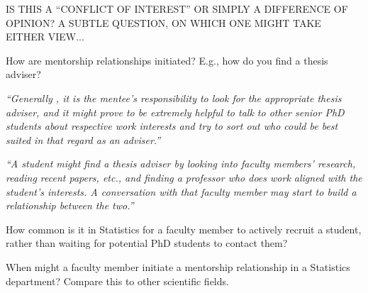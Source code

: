 \documentclass[portrait,11pt]{seminar}
\begin{document}
\medskip
IS THIS A ``CONFLICT OF INTEREST'' OR SIMPLY A DIFFERENCE OF OPINION? A SUBTLE QUESTION, ON WHICH ONE MIGHT TAKE EITHER VIEW...

\es

\bs

  How are mentorship relationships initiated? E.g., how do you find a thesis adviser?

{
\it  ``Generally , it is the mentee’s responsibility to look for the appropriate thesis adviser, and it might prove to be extremely helpful to talk to other senior PhD students about respective work interests and try to sort out who could be best suited in that regard as an adviser.''
}


{\it ``A student might find a thesis adviser by looking into faculty members’ research, reading recent papers, etc., and finding a professor who does work aligned with the student’s interests. A conversation with that faculty member may start to build a relationship between the two.''}




\es
\bs

How common is it in Statistics for a faculty member to actively recruit a student, rather than waiting for potential PhD students to contact them?

\medskip

When might a faculty member initiate a mentorship relationship in a Statistics department? Compare this to other scientific fields.


\es



\end{document}
